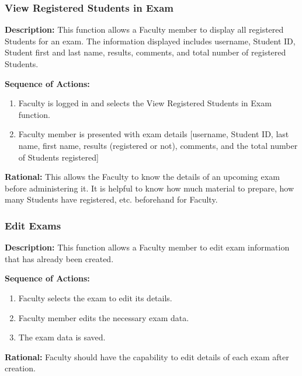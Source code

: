    \subsubsection{\large View Registered Students in Exam} 
   \begin{boxed} %
      \textbf{Description:}
      This function allows a Faculty member to display all registered
         Students for an exam. The information displayed includes username,
         Student ID, Student first and last name, results, comments, and total number
         of registered Students. 
         
         \vspace{3mm}
         \textbf{Sequence of Actions:}
         \begin{enumerate}
               
            \item Faculty is logged in and selects the View Registered Students
               in Exam function.
            \item Faculty member is presented with exam details [username,
               Student ID, last name, first name, results (registered or not),
               comments, and the total number of Students registered]
         \end{enumerate}

         \textbf{Rational:}
         This allows the Faculty to know the details of an upcoming exam before
         administering it. It is helpful to know how much material to prepare,
         how many Students have registered, etc. beforehand for Faculty.
   \end{boxed} %

   \subsubsection{\large Edit Exams} 
   \begin{boxed} %
      \textbf{Description:}
      This function allows a Faculty member to edit exam information
         that has already been created.
         
         \vspace{3mm}
         \textbf{Sequence of Actions:}
         \begin{enumerate}
               
            \item Faculty selects the exam to edit its details.
            \item Faculty member edits the necessary exam data.
            \item The exam data is saved.
         \end{enumerate}

         \textbf{Rational:}
         Faculty should have the capability to edit details of each exam after
         creation.
   \end{boxed} %

